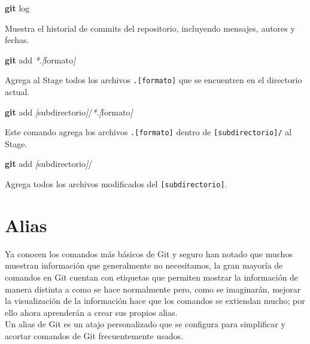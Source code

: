 \documentclass[
]{book}
\newenvironment{Shaded}{\begin{snugshade}}{\end{snugshade}}
\newcommand{\FunctionTok}[1]{\textcolor[rgb]{0.13,0.29,0.53}{\textbf{#1}}}
\newcommand{\NormalTok}[1]{#1}
\newcommand{\PreprocessorTok}[1]{\textcolor[rgb]{0.56,0.35,0.01}{\textit{#1}}}
\newcommand{\SpecialStringTok}[1]{\textcolor[rgb]{0.31,0.60,0.02}{#1}}
\begin{document}
\begin{Shaded}
\begin{Highlighting}[]
\FunctionTok{git}\NormalTok{ log}
\end{Highlighting}
\end{Shaded}

Muestra el historial de commits del repositorio, incluyendo mensajes, autores y fechas.

\begin{Shaded}
\begin{Highlighting}[]
\FunctionTok{git}\NormalTok{ add }\PreprocessorTok{*}\NormalTok{.}\PreprocessorTok{[}\SpecialStringTok{formato}\PreprocessorTok{]}
\end{Highlighting}
\end{Shaded}

Agrega al Stage todos los archivos \texttt{.{[}formato{]}} que se encuentren en el directorio actual.

\begin{Shaded}
\begin{Highlighting}[]
\FunctionTok{git}\NormalTok{ add }\PreprocessorTok{[}\SpecialStringTok{subdirectorio}\PreprocessorTok{]}\NormalTok{/}\PreprocessorTok{*}\NormalTok{.}\PreprocessorTok{[}\SpecialStringTok{formato}\PreprocessorTok{]}
\end{Highlighting}
\end{Shaded}

Este comando agrega los archivos \texttt{.{[}formato{]}} dentro de \texttt{{[}subdirectorio{]}/} al Stage.

\begin{Shaded}
\begin{Highlighting}[]
\FunctionTok{git}\NormalTok{ add }\PreprocessorTok{[}\SpecialStringTok{subdirectorio}\PreprocessorTok{]}\NormalTok{/}
\end{Highlighting}
\end{Shaded}

Agrega todos los archivos modificados del \texttt{{[}subdirectorio{]}}.

\section{Alias}\label{alias}

Ya conocen los comandos más básicos de Git y seguro han notado que muchos muestran información que generalmente no necesitamos, la gran mayoría de comandos en Git cuentan con etiquetas que permiten mostrar la información de manera distinta a como se hace normalmente pero, como se imaginarán, mejorar la visualización de la información hace que los comandos se extiendan mucho; por ello ahora aprenderán a crear sus propios alias.\\
Un alias de Git es un atajo personalizado que se configura para simplificar y acortar comandos de Git frecuentemente usados.
\end{document}
